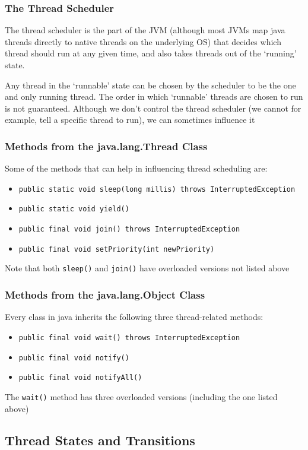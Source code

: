 \subsubsection{The Thread Scheduler}
The thread scheduler is the part of the JVM (although most JVMs map java 
threads directly to native threads on the underlying OS) that decides which 
thread should run at any given time, and also takes threads out of the 
`running' state.

Any thread in the `runnable' state can be chosen by the scheduler to be the one 
and only running thread. The order in which `runnable' threads are chosen to 
run is not guaranteed. Although we don't control the thread scheduler (we 
cannot for example, tell a specific thread to run), we can sometimes influence 
it

\subsubsection{Methods from the java.lang.Thread Class}
Some of the methods that can help in influencing thread scheduling are:
\begin{itemize}
    \item \verb#public static void sleep(long millis) throws InterruptedException#
    \item \verb#public static void yield()#
    \item \verb#public final void join() throws InterruptedException#
    \item \verb#public final void setPriority(int newPriority)#
\end{itemize}
Note that both \verb#sleep()# and \verb#join()# have overloaded versions not 
listed above

\subsubsection{Methods from the java.lang.Object Class}
Every class in java inherits the following three thread-related methods:
\begin{itemize}
    \item \verb#public final void wait() throws InterruptedException#
    \item \verb#public final void notify()#
    \item \verb#public final void notifyAll()#
\end{itemize}
The \verb#wait()# method has three overloaded versions (including the one 
listed above)

\subsection{Thread States and Transitions}
